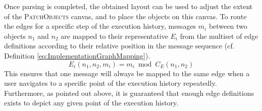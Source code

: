 Once parsing is completed, the obtained layout can be used to adjust the extent of the \textsc{PatchObjects} canvas, and to place the objects on this canvas.
To route the edges for a specific step of the execution history, messages $m_i$ between two objects $n_1$ and $n_2$ are mapped to their representative $E_i$ from the multiset of edge definitions according to their relative position in the message sequence (cf. Definition \ref{eq:ImplementationGraphMapping}).
\begin{equation}
E_i(n_1, n_2, m_i) = m_i \bmod C_E(n_1, n_2)
\label{eq:ImplementationGraphMapping}
\end{equation}
This ensures that one message will always be mapped to the same edge when a user navigates to a specific point of the execution history repeatedly.
Furthermore, as pointed out above, it is guaranteed that enough edge definitions exists to depict any given point of the execution history.